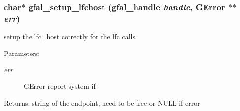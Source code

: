\subsubsection{\setlength{\rightskip}{0pt plus 5cm}char$\ast$ gfal\_\-setup\_\-lfchost (gfal\_\-handle {\em handle}, GError $\ast$$\ast$ {\em err})}\label{lfc__ifce__ng_8h_5d13dc09e91f66d74de768c2e4bf4872}


setup the lfc\_\-host correctly for the lfc calls \begin{Desc}
\item[Parameters:]
\begin{description}
\item[{\em err}]GError report system if \end{description}
\end{Desc}
\begin{Desc}
\item[Returns:]string of the endpoint, need to be free or NULL if error \end{Desc}
